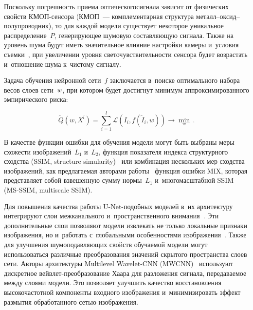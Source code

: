 \begin{multicols}{2}
Поскольку погрешность приема оптического\linebreak сигнала зависит от физических свойств 
КМОП-сен\-со\-ра (КМОП~--- комплементарная структура \mbox{ме\-талл}--ок\-сид--по\-лу\-про\-вод\-ник), 
то для каждой модели существует некоторое уникальное распределение~$\mathit{P}$, 
генерирующее шумовую составляющую сигнала. Также на уровень шума 
будут иметь значительное влияние настройки камеры и~условия 
съемки~\cite{IMAGE_NOISE_CONDITIONS}, при увеличении уровня 
светочувствительности сенсора будет возрастать и~отношение шума к~чистому 
сигналу.

Задача обучения нейронной сети~$f$ заключается в~поиске оптимального набора 
весов слоев сети~$\mathnormal{w}$, при котором будет достигнут минимум 
аппроксимированного эмпирического риска:

\vspace*{-2pt}

\noindent
\begin{equation*}
\label{eq:main_problem}
\tilde{Q}(w, X^{l}) = \sum\limits_{i=1}^{l}\mathcal{L}(I_i, 
f(\tilde{I}_i, w)) \rightarrow \min\limits_{w}\,.
\end{equation*}

\vspace*{-4pt}

В качестве функции ошибки для обучения модели могут быть выбраны меры схожести 
изображений~$L_{1}$ и~$L_{2}$, функция показателя индекса структурного сходства 
(SSIM, structure simularity)~\cite{SSIM} или комбинация нескольких мер сходства изображений, как 
предлагаемая авторами работы~\cite{MIX_LOSS} функция ошибки MIX, которая 
представляет собой взвешенную сумму нормы~$L_{1}$ и~многомасштабной SSIM (MS-SSIM, multiscale SSIM).

Для повышения качества работы U-Net-по\-доб\-ных моделей в~их архитектуру 
интегрируют слои межканального и~пространственного внимания~\cite{CBAMCB}. Эти 
дополнительные слои позволяют модели извлекать не только локальные признаки 
изоб\-ра\-же\-ния, но и~работать с~глобальными особенностями 
изображения~\cite{CBAM_USAGE}. Также для улучшения шумоподавляющих свойств 
обучаемой модели могут использоваться различные преобразования значений скрытого 
пространства слоев сети. Авторы архитектуры Multilevel Wavelet-CNN 
(MWCNN)~\cite{MWCNN} используют дискретное вейв\-лет-пре\-обра\-зо\-ва\-ние Хаара для 
разложения сигнала, передаваемое между слоями модели. Это позволяет улучшить 
качество восстановления высокочастотной компоненты входного изображения и~минимизировать эффект размытия обработанного сетью изображения.


\end{multicols}
